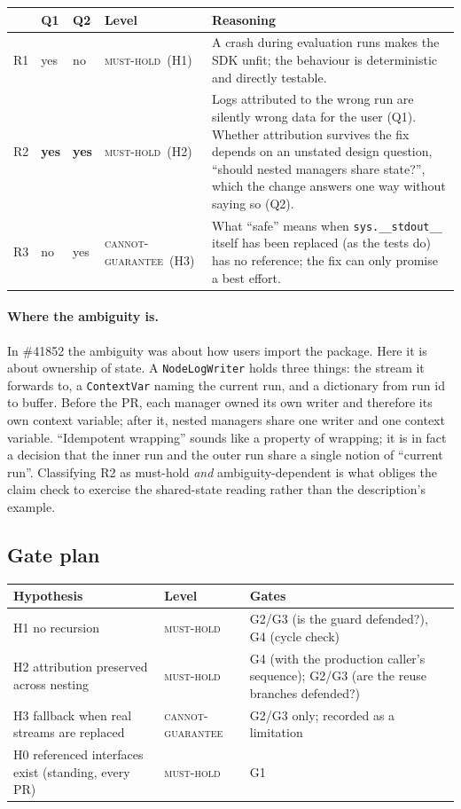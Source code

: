 \documentclass[11pt,a4paper]{article}
\newcommand{\code}[1]{\texttt{#1}}
\newcommand{\musthold}{\textsc{must-hold}}
\newcommand{\cannot}{\textsc{cannot-guarantee}}
\begin{document}
\begin{center}\small
\begin{tabularx}{\textwidth}{l l l l X}
\toprule
 & Q1 & Q2 & Level & Reasoning \\
\midrule
R1 & yes & no & \musthold\ (H1) & A crash during evaluation runs makes the SDK unfit; the behaviour is deterministic and directly testable. \\
R2 & \textbf{yes} & \textbf{yes} & \musthold\ (H2) & Logs attributed to the wrong run are silently wrong data for the user (Q1). Whether attribution survives the fix depends on an unstated design question, ``should nested managers share state?'', which the change answers one way without saying so (Q2). \\
R3 & no & yes & \cannot\ (H3) & What ``safe'' means when \code{sys.\_\_stdout\_\_} itself has been replaced (as the tests do) has no reference; the fix can only promise a best effort. \\
\bottomrule
\end{tabularx}
\end{center}

\paragraph{Where the ambiguity is.} In \#41852 the ambiguity was about how users import the package. Here it is about ownership of state. A \code{NodeLogWriter} holds three things: the stream it forwards to, a \code{ContextVar} naming the current run, and a dictionary from run id to buffer. Before the PR, each manager owned its own writer and therefore its own context variable; after it, nested managers share one writer and one context variable. ``Idempotent wrapping'' sounds like a property of wrapping; it is in fact a decision that the inner run and the outer run share a single notion of ``current run''. Classifying R2 as must-hold \emph{and} ambiguity-dependent is what obliges the claim check to exercise the shared-state reading rather than the description's example.

\subsection{Gate plan}
\begin{center}\small
\begin{tabularx}{\textwidth}{X l X}
\toprule
Hypothesis & Level & Gates \\
\midrule
H1 no recursion & \musthold & G2/G3 (is the guard defended?), G4 (cycle check) \\
H2 attribution preserved across nesting & \musthold & G4 (with the production caller's sequence); G2/G3 (are the reuse branches defended?) \\
H3 fallback when real streams are replaced & \cannot & G2/G3 only; recorded as a limitation \\
H0 referenced interfaces exist (standing, every PR) & \musthold & G1 \\
\bottomrule
\end{tabularx}
\end{center}
\end{document}
